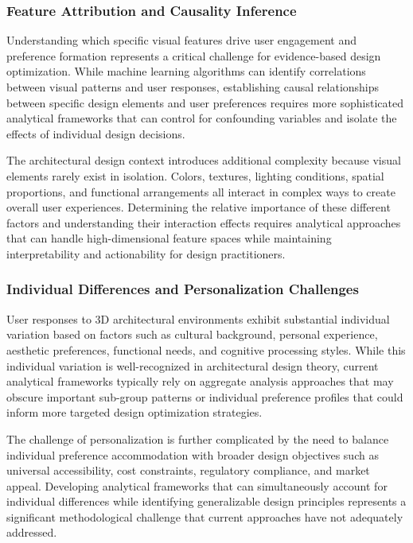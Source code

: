 \documentclass[12pt,a4paper]{book}
\begin{document}
\subsubsection{Feature Attribution and Causality Inference}
\label{subsubsec:feature_attribution}

Understanding which specific visual features drive user engagement and preference formation represents a critical challenge for evidence-based design optimization. While machine learning algorithms can identify correlations between visual patterns and user responses, establishing causal relationships between specific design elements and user preferences requires more sophisticated analytical frameworks that can control for confounding variables and isolate the effects of individual design decisions.

The architectural design context introduces additional complexity because visual elements rarely exist in isolation. Colors, textures, lighting conditions, spatial proportions, and functional arrangements all interact in complex ways to create overall user experiences. Determining the relative importance of these different factors and understanding their interaction effects requires analytical approaches that can handle high-dimensional feature spaces while maintaining interpretability and actionability for design practitioners.

\subsubsection{Individual Differences and Personalization Challenges}
\label{subsubsec:individual_differences}

User responses to 3D architectural environments exhibit substantial individual variation based on factors such as cultural background, personal experience, aesthetic preferences, functional needs, and cognitive processing styles. While this individual variation is well-recognized in architectural design theory, current analytical frameworks typically rely on aggregate analysis approaches that may obscure important sub-group patterns or individual preference profiles that could inform more targeted design optimization strategies.

The challenge of personalization is further complicated by the need to balance individual preference accommodation with broader design objectives such as universal accessibility, cost constraints, regulatory compliance, and market appeal. Developing analytical frameworks that can simultaneously account for individual differences while identifying generalizable design principles represents a significant methodological challenge that current approaches have not adequately addressed.
\end{document}
